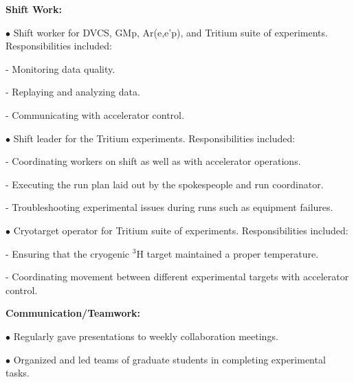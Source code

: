 \documentclass[letterpaper,10pt]{article}
\renewenvironment{itemize}{
  \begin{list}{}{
    \setlength{\leftmargin}{1.5em}
  }
}{
  \end{list}
}
\begin{document}
{\begin{itemize}
\begin{itemize}
     \item \textbf{Shift Work:}
     \begin{itemize}\itemsep5pt \parskip0pt 
      \item $\bullet$ Shift worker for DVCS, GMp, Ar(e,e'p), and Tritium suite of experiments. Responsibilities included: 
      	\begin{itemize}\itemsep2pt
      		\item - Monitoring data quality.
      		\item - Replaying and analyzing data. 
      		\item - Communicating with accelerator control.
      	\end{itemize} 
      \item $\bullet$ Shift leader for the Tritium experiments. Responsibilities included:
		\begin{itemize}\itemsep2pt
			\item - Coordinating workers on shift as well as with accelerator operations.
			\item - Executing the run plan laid out by the spokespeople and run coordinator. 
			\item - Troubleshooting experimental issues during runs such as equipment failures.
		\end{itemize}      
      \item $\bullet$ Cryotarget operator for Tritium suite of experiments. Responsibilities included:
      	\begin{itemize}\itemsep2pt
        		\item - Ensuring that the cryogenic $^{3}$H target maintained a proper temperature.
        		\item - Coordinating movement between different experimental targets with accelerator control.
      	\end{itemize}
     \end{itemize} 
     
     \item \textbf{Communication/Teamwork:}
		\begin{itemize}\itemsep5pt
			\item $\bullet$ Regularly gave presentations to weekly collaboration meetings.
			\item $\bullet$ Organized and led teams of graduate students in completing experimental tasks.
		\end{itemize}
     
 \end{itemize}
 

\end{itemize}}
\end{document}
